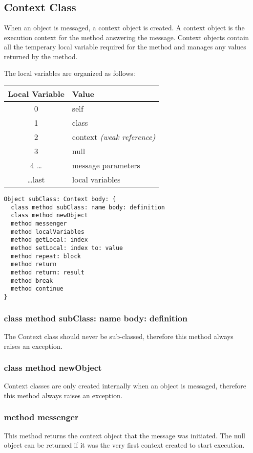 \subsection {Context Class}

When an object is messaged, a context object is created. A context object is
the execution context for the method answering the message. Context objects
contain all the temperary local variable required for the method and manages
any values returned by the method.

The local variables are organized as follows:

\begin{center}
  \begin{tabular}{ c | l }
    Local Variable & Value\\ \hline
    0 & self \\
    1 & class \\
    2 & context \textit{(weak reference)} \\
    3 & null \\
    4 \dots & message parameters \\
    \dots last & local variables \\
  \end{tabular}
\end{center}

\begin{lstlisting}
Object subClass: Context body: {
  class method subClass: name body: definition
  class method newObject
  method messenger
  method localVariables
  method getLocal: index
  method setLocal: index to: value
  method repeat: block
  method return
  method return: result
  method break
  method continue
}
\end{lstlisting}

\subsubsection {class method subClass: name body: definition}
The Context class should never be sub-classed, therefore this method always
raises an exception.

\subsubsection {class method newObject}
Context classes are only created internally when an object is messaged,
therefore this method always raises an exception.

\subsubsection {method messenger}
This method returns the context object that the message was initiated. The
null object can be returned if it was the very first context created to start
execution.


